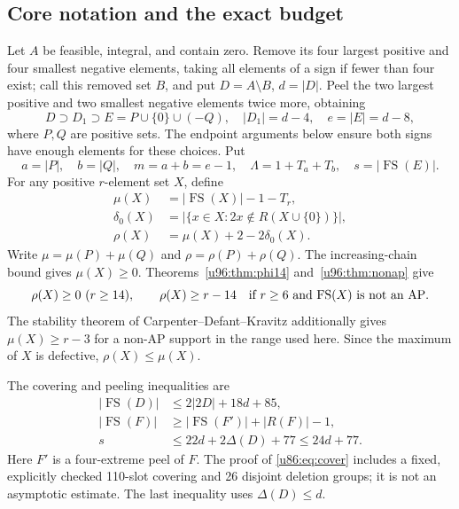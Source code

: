 \documentclass[11pt,a4paper]{article}
\theoremstyle{remark}
\newcommand{\FS}{\operatorname{FS}}
\begin{document}
\subsection{Core notation and the exact budget}\label{u86:sec:budget}
Let $A$ be feasible, integral, and contain zero. Remove its four largest
positive and four smallest negative elements, taking all elements of a
sign if fewer than four exist; call this removed set $B$, and put
$D=A\setminus B$, $d=|D|$. Peel the two largest positive and two smallest
negative elements twice more, obtaining
\[
 D\supset D_1\supset E=P\cup\{0\}\cup(-Q),\quad
 |D_1|=d-4,\quad e=|E|=d-8,
\]
where $P,Q$ are positive sets. The endpoint arguments below ensure both
signs have enough elements for these choices. Put
\[
 a=|P|,\quad b=|Q|,\quad m=a+b=e-1,\quad
 \Lambda=1+T_a+T_b,\quad s=|\FS(E)|.
\]
For any positive $r$-element set $X$, define
\begin{align*}
 \mu(X)&=|\FS(X)|-1-T_r,\\
 \delta_0(X)&=|\{x\in X:2x\notin R(X\cup\{0\})\}|,\\
 \rho(X)&=\mu(X)+2-2\delta_0(X).
\end{align*}
Write $\mu=\mu(P)+\mu(Q)$ and $\rho=\rho(P)+\rho(Q)$.
The increasing-chain bound gives $\mu(X)\ge0$. Theorems~\ref{u96:thm:phi14} and~\ref{u96:thm:nonap} give
\begin{equation}\label{u86:eq:input-rho}
 \rho(X)\ge0\ (r\ge14),\qquad
 \rho(X)\ge r-14\quad\hbox{if $r\ge6$ and $\FS(X)$ is not an AP}.
\end{equation}
The stability theorem of Carpenter--Defant--Kravitz \cite{CDK2026} additionally
gives $\mu(X)\ge r-3$ for a non-AP support in the range used here.
Since the maximum of $X$ is defective, $\rho(X)\le\mu(X)$.

The covering and peeling inequalities are
\begin{align}
 |\FS(D)|&\le2|2D|+18d+85,\label{u86:eq:cover}\\
 |\FS(F)|&\ge|\FS(F')|+|R(F)|-1,\label{u86:eq:peel}\\
 s&\le22d+2\Delta(D)+77\le24d+77.\label{u86:eq:corebound}
\end{align}
Here $F'$ is a four-extreme peel of $F$. The proof of \eqref{u86:eq:cover}
includes a fixed, explicitly checked 110-slot covering and 26 disjoint
deletion groups; it is not an asymptotic estimate. The last inequality
uses $\Delta(D)\le d$.
\end{document}
